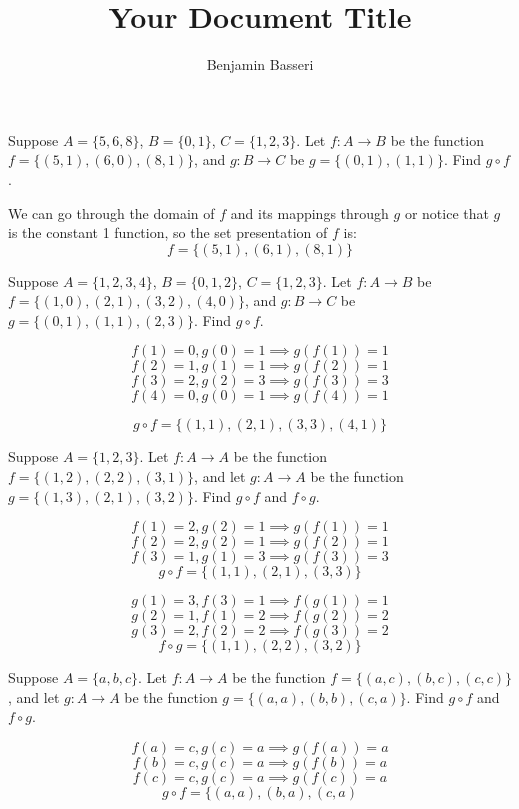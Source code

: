 \documentclass{article}
\title{Your Document Title}
\author{Benjamin Basseri}
\begin{document}
\maketitle

\begin{problem}
Suppose $A = \{5, 6, 8\}$, $B = \{0, 1\}$, $C = \{1, 2, 3\}$. Let $f : A \to B$ be the function $f = \{(5, 1), (6, 0), (8, 1)\}$, and $g : B \to C$ be $g = \{(0, 1), (1, 1)\}$. Find $g \circ f$.
\end{problem}

We can go through the domain of $f$ and its mappings through $g$ or notice that $g$ is the constant 1 function, so the set presentation of $f$ is:
$$f = \{(5, 1), (6, 1), (8, 1)\}$$

\begin{problem}
Suppose $A = \{1, 2, 3, 4\}$, $B = \{0, 1, 2\}$, $C = \{1, 2, 3\}$. Let $f : A \to B$ be $f = \{(1, 0), (2, 1), (3, 2), (4, 0)\}$, and $g : B \to C$ be $g = \{(0, 1), (1, 1), (2, 3)\}$. Find $g \circ f$.
\end{problem}

$$f(1) = 0, g(0) = 1 \implies g(f(1)) = 1$$
$$f(2) = 1, g(1) = 1 \implies g(f(2)) = 1$$
$$f(3) = 2, g(2) = 3 \implies g(f(3)) = 3$$
$$f(4) = 0, g(0) = 1 \implies g(f(4)) = 1$$

$$g\circ f = \{(1, 1), (2, 1), (3, 3), (4, 1)\}$$

\begin{problem}
Suppose $A = \{1, 2, 3\}$. Let $f : A \to A$ be the function $f = \{(1, 2), (2, 2), (3, 1)\}$, and let $g : A \to A$ be the function $g = \{(1, 3), (2, 1), (3, 2)\}$. Find $g \circ f$ and $f \circ g$.
\end{problem}

$$f(1) = 2, g(2) = 1 \implies g(f(1)) =1$$
$$f(2) = 2, g(2) = 1 \implies g(f(2)) = 1$$
$$f(3) = 1, g(1) = 3 \implies g(f(3)) = 3$$
$$g\circ f = \{(1, 1), (2, 1), (3, 3)\}$$

$$g(1) = 3, f(3) = 1 \implies f(g(1)) = 1$$
$$g(2) = 1, f(1) = 2 \implies f(g(2)) = 2$$
$$g(3) = 2, f(2) = 2 \implies f(g(3)) = 2$$
$$f\circ g = \{(1, 1), (2, 2), (3, 2)\}$$

\begin{problem}
Suppose $A = \{a, b, c\}$. Let $f : A \to A$ be the function $f = \{(a, c), (b, c), (c, c)\}$, and let $g : A \to A$ be the function $g = \{(a, a), (b, b), (c, a)\}$. Find $g \circ f$ and $f \circ g$.
\end{problem}

$$f(a) = c, g(c) = a \implies g(f(a)) = a$$
$$f(b) = c, g(c) = a \implies g(f(b)) = a$$
$$f(c) = c, g(c) = a \implies g(f(c)) = a$$
$$g \circ f = \{(a, a), (b, a), (c, a)$$
\end{document}
